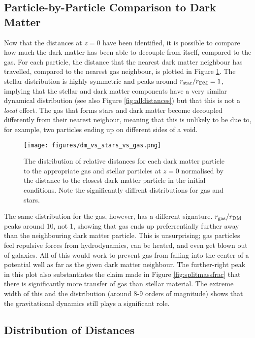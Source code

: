 \subsection{Particle-by-Particle Comparison to Dark Matter}

Now that the distances at $z=0$ have been identified, it is possible to compare how much the dark matter has been able to decouple from itself, compared to the gas. For each particle, the distance that the nearest dark matter neighbour has travelled, compared to the nearest gas neighbour, is plotted in Figure \ref{fig:dmvsstarvsgas}. The stellar distribution is highly symmetric and peaks around $r_{\rm star}/r_{\rm DM} = 1$, implying that the stellar and dark matter components have a very similar dynamical distribution (see also Figure \ref{fig:alldistances}) but that this is not a \emph{local} effect. The gas that forms stars and dark matter become decoupled differently from their nearest neigbour, meaning that this is unlikely to be due to, for example, two particles ending up on different sides of a void.

\begin{figure}
    \centering
    \texttt{[image: figures/dm\_vs\_stars\_vs\_gas.png]}
    \caption{The distribution of relative distances for each dark matter particle to the appropriate gas and stellar particles at $z=0$ normalised by the distance to the closest dark matter particle in the initial conditions. Note the significantly diffrent distributions for gas and stars.}
    \label{fig:dmvsstarvsgas}
\end{figure}

The same distribution for the gas, however, has a different signature. $r_{\rm gas}/r_{\rm DM}$ peaks around 10, not 1, showing that gas ends up preferrentially further away than the neighbouring dark matter particle. This is unsurprising; gas particles feel repulsive forces from hydrodynamics, can be heated, and even get blown out of galaxies. All of this would work to prevent gas from falling into the center of a potential well as far as the given dark matter neighbour. The further-right peak in this plot also substantiates the claim made in Figure \ref{fig:splitmassfrac} that there is significantly more transfer of gas than stellar material. The extreme width of this and the distribution (around 8-9 orders of magnitude) shows that the gravitational dynamics still plays a significant role.

\subsection{Distribution of Distances}

